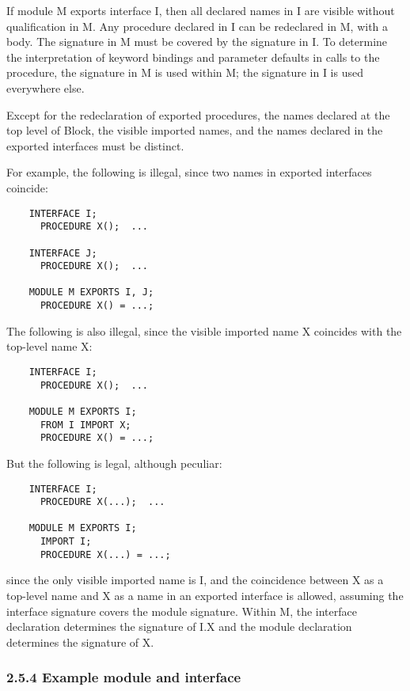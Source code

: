 \documentclass[10pt]{article}
\begin{document}
 If module M exports interface I, then all declared names in I are visible without qualification in M. Any procedure declared in I can be redeclared in M, with a body. The signature in M must be covered by the signature in I. To determine the interpretation of keyword bindings and parameter defaults in calls to the procedure, the signature in M is used within M; the signature in I is used everywhere else. 


  Except for the redeclaration of exported procedures, the names declared at the top level of Block, the visible imported names, and the names declared in the exported interfaces must be distinct. 


  For example, the following is illegal, since two names in exported interfaces coincide: 
\begin{verbatim}
    INTERFACE I;
      PROCEDURE X();  ...

    INTERFACE J;
      PROCEDURE X();  ...

    MODULE M EXPORTS I, J;
      PROCEDURE X() = ...;
\end{verbatim}



  The following is also illegal, since the visible imported name X coincides with the top-level name X: 
\begin{verbatim}
    INTERFACE I;
      PROCEDURE X();  ...

    MODULE M EXPORTS I;
      FROM I IMPORT X;
      PROCEDURE X() = ...;
\end{verbatim}



 But the following is legal, although peculiar: 
\begin{verbatim}
    INTERFACE I;
      PROCEDURE X(...);  ...

    MODULE M EXPORTS I;
      IMPORT I;
      PROCEDURE X(...) = ...;
\end{verbatim}



  since the only visible imported name is I, and the coincidence between X as a top-level name and X as a name in an exported interface is allowed, assuming the interface signature covers the module signature. Within M, the interface declaration determines the signature of I.X and the module declaration determines the signature of X. 


 
\subsubsection*{2.5.4 Example module and interface}
\end{document}
